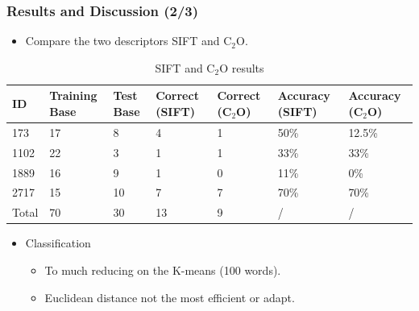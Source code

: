 \documentclass[xcolor=table]{beamer}
\begin{document}
\begin{frame} \frametitle{Results and Discussion (2/3)}


\begin{itemize}
\item Compare the two descriptors SIFT and C$_2$O.
\end{itemize}

\begin{tiny}
\begin{table}[H]
\centering
\caption{SIFT and C$_2$O results}
\label{tab1}
\begin{tabular}{|l|l|l|l|l||l|l|}
\hline
ID & Training Base & Test Base & Correct (SIFT) & Correct (C$_2$O) & Accuracy (SIFT) & Accuracy (C$_2$O) \\ \hline
173 & 17 & 8 & 4 & 1 & 50\% & 12.5\% \\ \hline
1102 & 22 & 3 & 1 & 1 & \cellcolor{red!75} 33\% &\cellcolor{red!75} 33\% \\ \hline
1889 & 16 & 9 & 1 & 0 & 11\% & 0\% \\ \hline
2717 & 15 & 10 & 7 & 7 &\cellcolor{red!75} 70\% &\cellcolor{red!75} 70\% \\ \hline
Total & 70 & 30 & 13 & 9 & / & / \\ \hline
\end{tabular}
\end{table}
\end{tiny}

\begin{itemize}
\item Classification
\vspace{0.3cm}
\begin{itemize}
\item To much reducing on the K-means (100 words).
\vspace{0.15cm}
\item Euclidean distance not the most efficient or adapt.
\end{itemize}
\end{itemize}

\end{frame}
\end{document}
